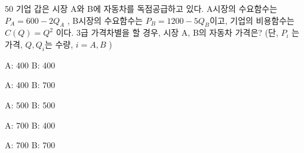 \begin{question}{50}
기업 갑은 시장 A와 B에 자동차를 독점공급하고 있다. A시장의 수요함수는 $P_{A}=600-2Q_{A}$ , B시장의 수요함수는 $P_{B}=1200-5Q_{B}$이고, 기업의 비용함수는
$C(Q)=Q^{2}$ 이다. 3급 가격차별을 할 경우, 시장 A, B의 자동차 가격은? (단, $P_{i}$ 는 가격, $Q,Q_{i}$는 수량, $i=A,B$ )
\begin{choices}
  \item A: 400 B: 400
  \item A: 400 B: 700
  \item A: 500 B: 500
  \item A: 700 B: 400
  \item A: 700 B: 700
\end{choices}
\end{question}
\answerall
{}
